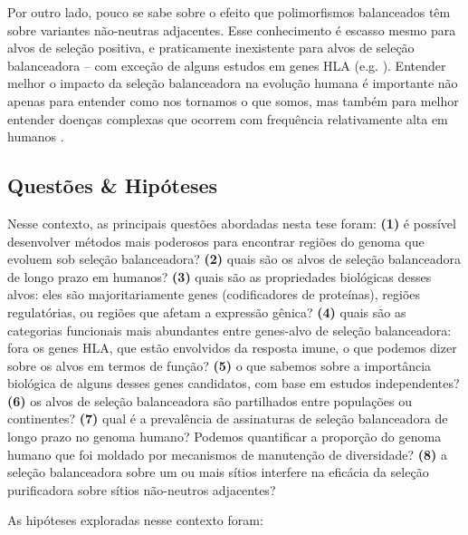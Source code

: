 \begin{refsection}
Por outro lado, pouco se sabe sobre o efeito que polimorfismos balanceados têm sobre variantes não-neutras adjacentes. Esse conhecimento é escasso mesmo para alvos de seleção positiva, e praticamente inexistente para alvos de seleção balanceadora -- com exceção de alguns estudos em genes HLA (e.g. \cite{VanOosterhout2009, Lenz2016}). 
%
Entender melhor o impacto da seleção balanceadora na evolução humana é importante não apenas para entender como nos tornamos o que somos, mas também para melhor entender doenças complexas que ocorrem com frequência relativamente alta em humanos \parencite{VallenderJohnson2008}.
%
\subsection{\label{subsec:Perguntas}Questões \& Hipóteses}
Nesse contexto, as principais questões abordadas nesta tese foram: \textbf{(1)} é possível desenvolver métodos mais poderosos para encontrar regiões do genoma que evoluem sob seleção balanceadora? \textbf{(2)} quais são os alvos de seleção balanceadora de longo prazo em humanos? %
\textbf{(3)} quais são as propriedades biológicas desses alvos: eles são majoritariamente genes (codificadores de proteínas), regiões regulatórias, ou regiões que afetam a expressão gênica? \textbf{(4)} quais são as categorias funcionais mais abundantes entre genes-alvo de seleção balanceadora: fora os genes HLA, que estão envolvidos da resposta imune, o que podemos dizer sobre os alvos em termos de função? \textbf{(5)} o que sabemos sobre a importância biológica de alguns desses genes candidatos, com base em estudos independentes? \textbf{(6)} os alvos de seleção balanceadora são partilhados entre populações ou continentes? \textbf{(7)} qual é a prevalência de assinaturas de seleção balanceadora de longo prazo no genoma humano? Podemos quantificar a proporção do genoma humano que foi moldado por mecanismos de manutenção de diversidade?  \textbf{(8)} a seleção balanceadora sobre um ou mais sítios interfere na eficácia da seleção purificadora sobre sítios não-neutros adjacentes? 



As hipóteses exploradas nesse contexto foram: 
\begin{itemize}


\end{itemize}
\end{refsection}
